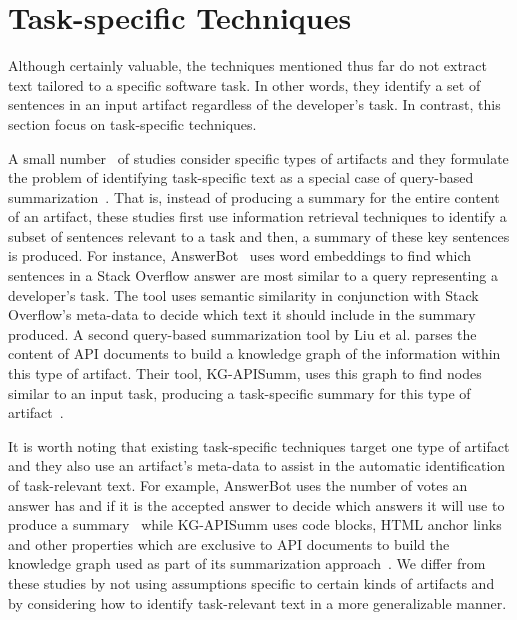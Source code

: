 



\section{Task-specific Techniques}
\label{cp2:task-approaches}



Although certainly valuable, the techniques mentioned thus far
do not extract text tailored to 
a specific software task. In other words, they identify 
a set of sentences in an input artifact regardless of the developer's task. 
In contrast, this section focus on task-specific techniques.

A small number~\cite{Xu2017, silva2019, liu2019qapi} of studies consider specific types of artifacts and
they formulate the problem of identifying task-specific text as 
a special case of query-based summarization~\cite{Goldsteinet1999}. That is, 
instead of producing a summary for the entire content of 
an artifact,
these studies first use information retrieval techniques
to identify a subset 
of sentences relevant to a task and then, 
a summary of these key sentences is produced.
For instance, 
AnswerBot~\cite{Xu2017} uses word embeddings to find which sentences in a Stack Overflow answer 
are most similar to a query representing a developer's task.
The tool uses semantic similarity in conjunction with 
Stack Overflow's meta-data to decide which text  it should include
in the summary produced. 
A second query-based summarization tool by Liu et al. parses the content 
of API documents to build a knowledge graph of the information within this type of artifact. 
Their tool, KG-APISumm, uses this graph 
to find nodes similar to an input task, 
producing a task-specific summary for this type of artifact~\cite{liu2019qapi}. 


It is worth noting that existing task-specific techniques
target one type of artifact and they also use an artifact's meta-data to 
assist in the automatic identification of task-relevant text. 
For example, AnswerBot uses the number of votes an answer has and if it is the accepted answer to decide which answers it will use to produce a summary~\cite{Xu2017}
while KG-APISumm uses 
code blocks, HTML anchor links and other properties which are exclusive to API documents to build the knowledge graph used as part of its summarization approach~\cite{liu2019qapi}.
We differ from these studies 
by not using assumptions 
specific to certain kinds of artifacts
and by considering how to identify task-relevant text 
in a more generalizable manner.






